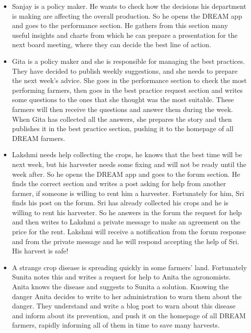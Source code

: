\documentclass{article}
\begin{document}
\begin{itemize}
        \item Sanjay is a policy maker. He wants to check how the decisions his department is making are affecting the overall production. So he opens the DREAM app and goes to the performance section. He gathers from this section many useful insights and charts from which he can prepare a presentation for the next board meeting, where they can decide the best line of action.
        
        \item Gita is a policy maker and she is responsible for managing the best practices. They have decided to publish weekly suggestions, and she needs to prepare the next week's advice. She goes in the performance section to check the most performing farmers, then goes in the best practice request section and writes some questions to the ones that she thought was the most suitable. These farmers will then receive the questions and answer them during the week. When Gita has collected all the answers, she prepares the story and then publishes it in the best practice section, pushing it to the homepage of all DREAM farmers.
        
        \item Lakshmi needs help collecting the crops, he knows that the best time will be next week, but his harvester needs some fixing and will not be ready until the week after. So he opens the DREAM app and goes to the forum section. He finds the correct section and writes a post asking for help from another farmer, if someone is willing to rent him a harvester. Fortunately for him, Sri finds his post on the forum. Sri has already collected his crops and he is willing to rent his harvester. So he answers in the forum the request for help and then writes to Lakshmi a private message to make an agreement on the price for the rent. Lakshmi will receive a notification from the forum response and from the private message and he will respond accepting the help of Sri. His harvest is safe!
        
        \item A strange crop disease is spreading quickly in some farmers' land. Fortunately Sunita notes this and writes a request for help to Anita the agronomists. Anita knows the disease and suggests to Sunita a solution. Knowing the danger Anita decides to write to her administration to warn them about the danger. They understand and  write a blog post to warn about this disease and inform about its prevention, and  push it on the homepage of all DREAM farmers, rapidly informing all of them in time to save many harvests.
    \end{itemize}
\end{document}
